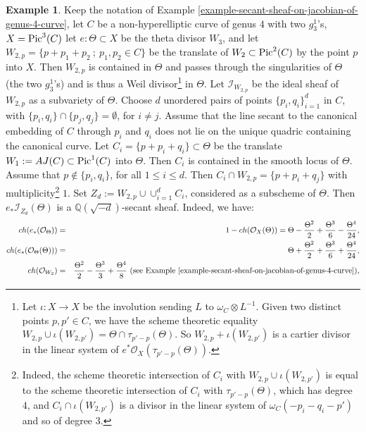 \documentclass[12pt]{amsart}
\numberwithin{equation}{subsection}
\theoremstyle{plain}
\theoremstyle{definition}
\newtheorem{example}[thm]{Example}
\newcommand{\QQ}{{\mathbb Q}}
\newcommand{\StructureSheaf}[1]{{\mathcal O}_{#1}}
\newcommand{\Pic}{{\rm Pic}}
\newcommand{\Ideal}[1]{{\mathcal I}_{#1}}
\begin{document}
\begin{example}
Keep the notation of Example \ref{example-secant-sheaf-on-jacobian-of-genus-4-curve}, let $C$ be a non-hyperelliptic curve of genus $4$ with two $g^1_3$'s, $X=\Pic^3(C)$
let $e:\Theta\subset X$ be the theta divisor $W_3$, and let $W_{2,p}=\{p+p_1+p_2 \ ; \ p_1, p_2\in C\}$ be the translate of $W_2\subset \Pic^2(C)$ by the point $p$ into $X$. Then $W_{2,p}$ is contained in $\Theta$ and passes through the singularities of $\Theta$ (the two $g^1_3$'s) and is thus a Weil divisor\footnote{
Let $\iota:X\rightarrow X$ be the involution sending $L$ to $\omega_C\otimes L^{-1}$. Given two distinct points $p,p'\in C$, we have the scheme theoretic equality $W_{2,p}\cup \iota(W_{2,p'})=\Theta\cap \tau_{p'-p}(\Theta)$.
So $W_{2,p}+ \iota(W_{2,p'})$ is a cartier divisor in the linear system of $e^*\StructureSheaf{X}(\tau_{p'-p}(\Theta))$.
} 
in $\Theta$. Let $\Ideal{W_{2,p}}$ be the ideal sheaf of $W_{2,p}$ as a subvariety of $\Theta$. Choose $d$ unordered pairs of points $\{p_i,q_i\}_{i=1}^d$ in $C$, with $\{p_i,q_i\}\cap\{p_j,q_j\}=\emptyset$, for $i\neq j$. Assume that the line secant to the canonical embedding of $C$ through $p_i$ and $q_i$ does not lie on the unique quadric containing the canonical curve. 
Let $C_i=\{p+p_i+q_i\}\subset \Theta$ be 
the translate $W_1:=AJ(C)\subset \Pic^1(C)$ into $\Theta$. Then $C_i$ is contained in the smooth locus of $\Theta$. Assume that $p\not\in\{p_i,q_i\}$, for all $1\leq i\leq d$. Then $C_i\cap W_{2,p}=\{p+p_i+q_j\}$ with multiplicity\footnote{
Indeed, the scheme theoretic intersection of $C_i$ with $W_{2,p}\cup \iota(W_{2,p'})$ is equal to the scheme theoretic intersection of $C_i$ with $\tau_{p'-p}(\Theta)$, which has degree $4$, and $C_i\cap \iota(W_{2,p'})$ is a divisor in the linear system of $\omega_C(-p_i-q_i-p')$ and so of degree $3$.
}
$1$.
Set $Z_d:=W_{2,p}\cup \cup_{i=1}^d C_i$, considered as a subscheme of $\Theta$. Then $e_*\Ideal{Z_d}(\Theta)$ is a $\QQ(\sqrt{-d})$-secant sheaf. Indeed, we have:
\begin{eqnarray*}
ch(e_*(\StructureSheaf{\Theta}))&=& 1-ch(\StructureSheaf{X}(\Theta))=\Theta-\frac{\Theta^2}{2}+\frac{\Theta^3}{6}-\frac{\Theta^4}{24},
\\
ch(e_*(\StructureSheaf{\Theta}(\Theta)))&=& \Theta+\frac{\Theta^2}{2}+\frac{\Theta^3}{6}+\frac{\Theta^4}{24},
\\
ch(\StructureSheaf{W_2})&=& \frac{\Theta^2}{2}-\frac{\Theta^3}{3}+\frac{\Theta^4}{8} \ \mbox{(see Example \ref{example-secant-sheaf-on-jacobian-of-genus-4-curve})},
\\

\end{eqnarray*}
\end{example}
\end{document}
